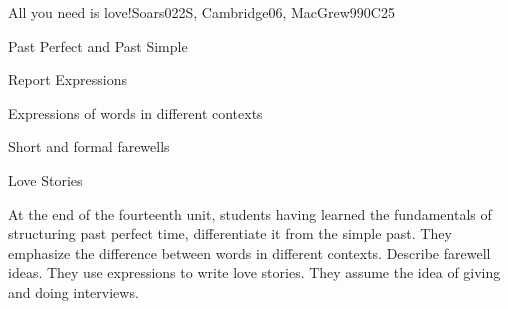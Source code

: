 \begin{syllabus}
\begin{unit}{All you need is love!}{}{Soars022S, Cambridge06, MacGrew99}{0}{C25}
   \begin{topics}
       \item Past Perfect and Past Simple
       \item Report Expressions
       \item Expressions of words in different contexts
       \item Short and formal farewells
       \item Love Stories
   \end{topics}

   \begin{learningoutcomes}
      \item At the end of the fourteenth unit, students having learned the fundamentals of structuring past perfect time, differentiate it from the simple past. They emphasize the difference between words in different contexts. Describe farewell ideas. They use expressions to write love stories. They assume the idea of giving and doing interviews.
   \end{learningoutcomes}
\end{unit}

\begin{coursebibliography}
\end{coursebibliography}

\end{syllabus}
%
